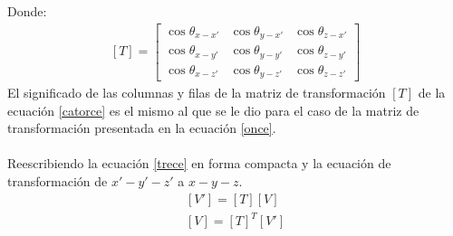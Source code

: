 \documentclass[12pt,letterpaper]{article}
\begin{document}
%
Donde:
%
\begin{align}
	\left[ T \right] = \left[ \begin{array}{ccc}
		\cos \theta_{x-x'} & \cos \theta_{y-x'} & \cos \theta_{z-x'} \\  
		\cos \theta_{x-y'} & \cos \theta_{y-y'} & \cos \theta_{z-y'} \\
		\cos \theta_{x-z'} & \cos \theta_{y-z'} & \cos \theta_{z-z'}
		\end{array}  \right] \label{catorce}
\end{align}
%
El significado de las columnas y filas de la matriz de transformación $\left[ T \right]$ de la ecuación \ref{catorce} es el mismo al que se le dio para el caso de la matriz de transformación presentada en la ecuación \ref{once}.\\\\
%
Reescribiendo la ecuación \ref{trece} en forma compacta y la ecuación de transformación de $x'-y'-z'$ a $x-y-z$.
%
\begin{align*}
	\left[ V' \right] = \left[ T \right] \left[ V \right] \\
	\left[ V \right] = \left[ T \right]^T \left[ V' \right]
\end{align*}
%
%
\end{document}
